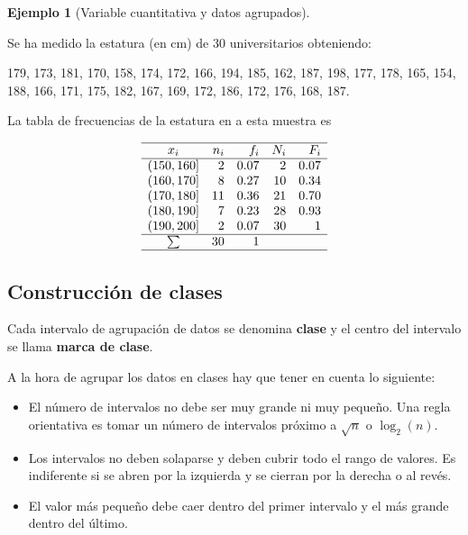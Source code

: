 \documentclass[
  a4paper,
]{scrreport}
\providecommand{\tightlist}{%
  \setlength{\itemsep}{0pt}\setlength{\parskip}{0pt}}\usepackage{longtable,booktabs,array}
\theoremstyle{plain}
\theoremstyle{definition}
\newtheorem{example}{Ejemplo}[chapter]
\theoremstyle{definition}
\theoremstyle{remark}
\begin{document}
\begin{example}[Variable cuantitativa y datos
agrupados]\protect\hypertarget{exm-tabla-frecuencias-datos-agrupados}{}\label{exm-tabla-frecuencias-datos-agrupados}

Se ha medido la estatura (en cm) de 30 universitarios obteniendo:

179, 173, 181, 170, 158, 174, 172, 166, 194, 185, 162, 187, 198, 177,
178, 165, 154, 188, 166, 171, 175, 182, 167, 169, 172, 186, 172, 176,
168, 187.

La tabla de frecuencias de la estatura en a esta muestra es

\[ 
\begin{array}{crrrr}
\hline
x_i & n_i & f_i & N_i & F_i\\
\hline
(150,160] & 2 & 0.07 & 2 & 0.07\\
(160,170] & 8 & 0.27 & 10 & 0.34\\
(170,180] & 11 & 0.36 & 21 & 0.70\\
(180,190] & 7 & 0.23 & 28 & 0.93\\
(190,200] & 2 & 0.07 & 30 & 1 \\
\hline
\sum & 30 & 1 \\
\hline
\end{array}
\]

\end{example}

\hypertarget{construcciuxf3n-de-clases}{%
\subsection{Construcción de clases}\label{construcciuxf3n-de-clases}}

Cada intervalo de agrupación de datos se denomina \textbf{clase} y el
centro del intervalo se llama \textbf{marca de clase}.

A la hora de agrupar los datos en clases hay que tener en cuenta lo
siguiente:

\begin{itemize}
\tightlist
\item
  El número de intervalos no debe ser muy grande ni muy pequeño. Una
  regla orientativa es tomar un número de intervalos próximo a
  \(\sqrt{n}\) o \(\log_2(n)\).
\item
  Los intervalos no deben solaparse y deben cubrir todo el rango de
  valores. Es indiferente si se abren por la izquierda y se cierran por
  la derecha o al revés.
\item
  El valor más pequeño debe caer dentro del primer intervalo y el más
  grande dentro del último.
\end{itemize}
\end{document}
